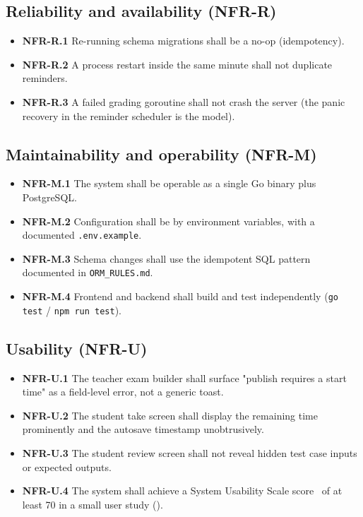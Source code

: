 \subsection{Reliability and availability (NFR-R)}

\begin{itemize}
  \item \textbf{NFR-R.1} Re-running schema migrations shall be a no-op (idempotency).
  \item \textbf{NFR-R.2} A process restart inside the same minute shall not duplicate reminders.
  \item \textbf{NFR-R.3} A failed grading goroutine shall not crash the server (the panic recovery in the reminder scheduler is the model).
\end{itemize}

\subsection{Maintainability and operability (NFR-M)}

\begin{itemize}
  \item \textbf{NFR-M.1} The system shall be operable as a single Go binary plus PostgreSQL.
  \item \textbf{NFR-M.2} Configuration shall be by environment variables, with a documented \texttt{.env.example}.
  \item \textbf{NFR-M.3} Schema changes shall use the idempotent SQL pattern documented in \texttt{ORM\_RULES.md}.
  \item \textbf{NFR-M.4} Frontend and backend shall build and test independently (\texttt{go test} / \texttt{npm run test}).
\end{itemize}

\subsection{Usability (NFR-U)}

\begin{itemize}
  \item \textbf{NFR-U.1} The teacher exam builder shall surface "publish requires a start time" as a field-level error, not a generic toast.
  \item \textbf{NFR-U.2} The student take screen shall display the remaining time prominently and the autosave timestamp unobtrusively.
  \item \textbf{NFR-U.3} The student review screen shall not reveal hidden test case inputs or expected outputs.
  \item \textbf{NFR-U.4} The system shall achieve a System Usability Scale score~\cite{brooke1996sus} of at least 70 in a small user study ().
\end{itemize}


